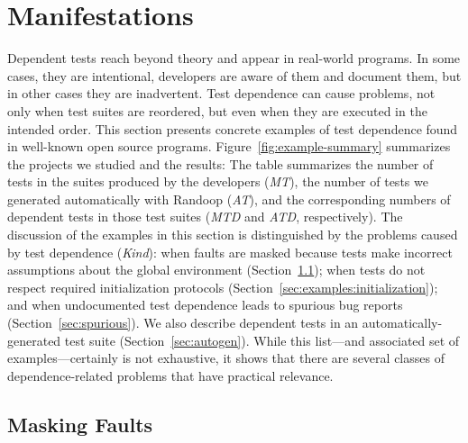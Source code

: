 \section{Manifestations}
\label{sec:examples}



Dependent tests reach beyond theory and appear in real-world programs.  
In some cases, they are intentional, developers are aware of them and
document them, but in other cases they are inadvertent. 
Test dependence can cause problems, not only when test suites are reordered,
but even when they are
executed in the intended order.
This section presents concrete examples of test dependence found in
well-known open source programs. Figure~\ref{fig:example-summary}
summarizes the projects we studied and the results: The table
summarizes the number of tests in the suites produced by the
developers (\emph{MT}), the number of tests we generated automatically
with Randoop (\emph{AT}), and the corresponding numbers of dependent
tests in those test suites (\emph{MTD} and \emph{ATD}, respectively). 
The discussion of the examples in this section is distinguished by
the problems caused by test dependence (\emph{Kind}): when faults are masked because
tests make incorrect assumptions about the global environment (Section~\ref{sec:mask}); 
when tests do not
respect required initialization protocols (Section~\ref{sec:examples:initialization}); and when
undocumented test dependence leads to spurious bug reports (Section~\ref{sec:spurious}).
We also describe dependent tests in an automatically-generated test
suite (Section~\ref{sec:autogen}).
While this list---and associated set of examples---certainly is not exhaustive, it shows that there are
several classes of dependence-related problems that have practical
relevance.



\subsection{Masking Faults}\label{sec:mask}

